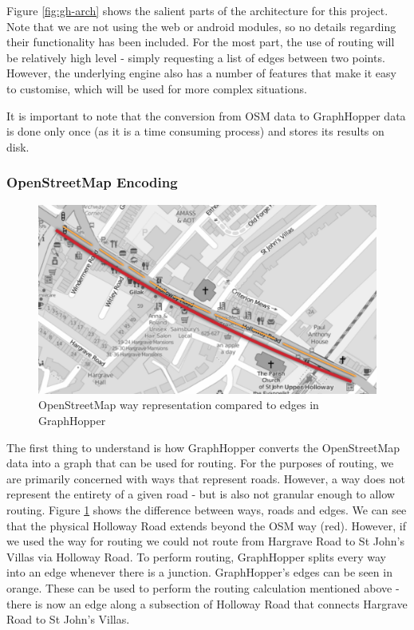 \documentclass[ %
                    author={Alexander Hill},
                supervisor={Dr. Benjamin Sach},
                    degree={MEng},
                     title={MARMOSET},
                  subtitle={Multi-Agent Route Management using Online Simulation for Efficient Transportation},
                      type={research},
                      year={2016} ]{dissertation}
\begin{document}
Figure \ref{fig:gh-arch} shows the salient parts of the architecture for this
project.  Note that we are not using the web or android modules, so no details
regarding their functionality has been included. For the most part, the use of
routing will be relatively high level - simply requesting a list of edges
between two points. However, the underlying engine also has a number of features
that make it easy to customise, which will be used for more complex situations.

It is important to note that the conversion from OSM data to GraphHopper data is
done only once (as it is a time consuming process) and stores its results on
disk.

\subsubsection{OpenStreetMap Encoding}

\begin{figure}[p]
    \centering
    \includegraphics[scale=0.6]{osm-gh}
    \caption{OpenStreetMap way representation compared to edges in GraphHopper}\label{fig:osm-gh}
\end{figure}

The first thing to understand is how GraphHopper converts the OpenStreetMap data
into a graph that can be used for routing.  For the purposes of routing, we are
primarily concerned with ways that represent roads. However, a way does not
represent the entirety of a given road - but is also not granular enough to
allow routing. Figure \ref{fig:osm-gh} shows the difference between ways, roads
and edges. We can see that the physical Holloway Road extends beyond the OSM way
(red). However, if we used the way for routing we could not route from Hargrave
Road to St John's Villas via Holloway Road. To perform routing, GraphHopper
splits every way into an edge whenever there is a junction. GraphHopper's edges
can be seen in orange. These can be used to perform the routing calculation
mentioned above - there is now an edge along a subsection of Holloway Road that
connects Hargrave Road to St John's Villas.
\end{document}

